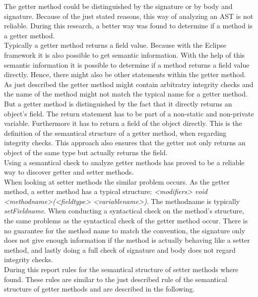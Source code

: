 The getter method could be distinguished by the signature or by body and signature. Because of the just stated reasons, this way of analyzing an \ac{AST} is not reliable. During this research, a better way was found to determine if a method is a getter method. 
\\

Typically a getter method returns a field value. Because with the Eclipse framework it is also possible to get semantic information. With the help of this semantic information it is possible to determine if a method returns a field value directly. Hence, there might also be other statements within the getter method. 
\\

As just described the getter method might contain arbitratry integrity checks and the name of the method might not match the typical name for a getter method. But a getter method is distinguished by the fact that it directly returns an object's field. The return statement has to be part of a non-static and non-private variable. Furthermore it has to return a field of the object directly. This is the definition of the semantical structure of a getter method, when regarding integrity checks. This approach also ensures that the getter not only returns an object of the same type but actually returns the field. 
\\

Using a semantical check to analyze getter methods has proved to be a reliable way to discover getter and setter methods.
\\

When looking at setter methods the similar problem occurs. As the getter method, a setter method has a typical structure: \textit{<modifiers> void <methodname>(<fieldtype> <variablename>)}. The methodname is typically \textit{setFieldname}. When conducting a syntactical check on the method's structure, the same problems as the syntactical check of the getter method occur. There is no guarantee for the method name to match the convention, the signature only does not give enough information if the method is actually behaving like a setter method, and lastly doing a full check of signature and body does not regard integrity checks.
\\

During this report rules for the semantical structure of setter methods where found. These rules are similar to the just described rule of the semantical structure of getter methods and are described in the following.
\\

